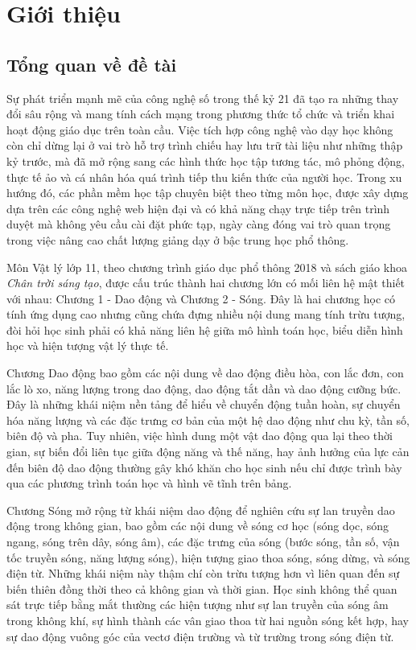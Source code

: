 
\chapter{Giới thiệu}

\section{Tổng quan về đề tài}
Sự phát triển mạnh mẽ của công nghệ số trong thế kỷ 21 đã tạo ra những thay đổi sâu rộng và mang tính cách mạng trong phương thức tổ chức và triển khai hoạt động giáo dục trên toàn cầu. Việc tích hợp công nghệ vào dạy học không còn chỉ dừng lại ở vai trò hỗ trợ trình chiếu hay lưu trữ tài liệu như những thập kỷ trước, mà đã mở rộng sang các hình thức học tập tương tác, mô phỏng động, thực tế ảo và cá nhân hóa quá trình tiếp thu kiến thức của người học. Trong xu hướng đó, các phần mềm học tập chuyên biệt theo từng môn học, được xây dựng dựa trên các công nghệ web hiện đại và có khả năng chạy trực tiếp trên trình duyệt mà không yêu cầu cài đặt phức tạp, ngày càng đóng vai trò quan trọng trong việc nâng cao chất lượng giảng dạy ở bậc trung học phổ thông.

Môn Vật lý lớp 11, theo chương trình giáo dục phổ thông 2018 và sách giáo khoa \textit{Chân trời sáng tạo}, được cấu trúc thành hai chương lớn có mối liên hệ mật thiết với nhau: Chương 1 - Dao động và Chương 2 - Sóng. Đây là hai chương học có tính ứng dụng cao nhưng cũng chứa đựng nhiều nội dung mang tính trừu tượng, đòi hỏi học sinh phải có khả năng liên hệ giữa mô hình toán học, biểu diễn hình học và hiện tượng vật lý thực tế. 

Chương Dao động bao gồm các nội dung về dao động điều hòa, con lắc đơn, con lắc lò xo, năng lượng trong dao động, dao động tắt dần và dao động cưỡng bức. Đây là những khái niệm nền tảng để hiểu về chuyển động tuần hoàn, sự chuyển hóa năng lượng và các đặc trưng cơ bản của một hệ dao động như chu kỳ, tần số, biên độ và pha. Tuy nhiên, việc hình dung một vật dao động qua lại theo thời gian, sự biến đổi liên tục giữa động năng và thế năng, hay ảnh hưởng của lực cản đến biên độ dao động thường gây khó khăn cho học sinh nếu chỉ được trình bày qua các phương trình toán học và hình vẽ tĩnh trên bảng.

Chương Sóng mở rộng từ khái niệm dao động để nghiên cứu sự lan truyền dao động trong không gian, bao gồm các nội dung về sóng cơ học (sóng dọc, sóng ngang, sóng trên dây, sóng âm), các đặc trưng của sóng (bước sóng, tần số, vận tốc truyền sóng, năng lượng sóng), hiện tượng giao thoa sóng, sóng dừng, và sóng điện từ. Những khái niệm này thậm chí còn trừu tượng hơn vì liên quan đến sự biến thiên đồng thời theo cả không gian và thời gian. Học sinh không thể quan sát trực tiếp bằng mắt thường các hiện tượng như sự lan truyền của sóng âm trong không khí, sự hình thành các vân giao thoa từ hai nguồn sóng kết hợp, hay sự dao động vuông góc của vectơ điện trường và từ trường trong sóng điện từ.

